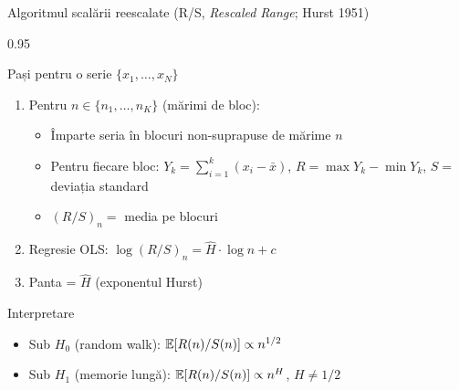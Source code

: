 \documentclass[9pt, aspectratio=169, t]{beamer}
\begin{document}
\begin{frame}[shrink=15]{Algoritmul scalării reescalate (R/S, \textit{Rescaled Range}; Hurst 1951)}
\begin{cminipage}{0.95\textwidth}
\begin{block}{Pași pentru o serie $\{x_1,\ldots,x_N\}$}
\begin{enumerate}\setlength{\itemsep}{1pt}
    \item Pentru $n\in\{n_1,\ldots,n_K\}$ (mărimi de bloc):
    \begin{itemize}\setlength{\itemsep}{0pt}
        \item Împarte seria în blocuri non-suprapuse de mărime $n$
        \item Pentru fiecare bloc: $Y_k=\sum_{i=1}^k(x_i-\bar x)$, $R=\max Y_k-\min Y_k$, $S=$ deviația standard
        \item $(R/S)_n=$ media pe blocuri
    \end{itemize}
    \item Regresie OLS: $\log(R/S)_n=\hat H\cdot\log n+c$
    \item Panta = $\hat H$ (exponentul Hurst)
\end{enumerate}
\end{block}
\begin{exampleblock}{Interpretare}
\begin{itemize}\setlength{\itemsep}{0pt}
    \item Sub $H_0$ (random walk): $\mathbb{E}[R(n)/S(n)]\propto n^{1/2}$
    \item Sub $H_1$ (memorie lungă): $\mathbb{E}[R(n)/S(n)]\propto n^H$, $H\neq 1/2$
\end{itemize}
\end{exampleblock}
\end{cminipage}
\end{frame}
\end{document}
